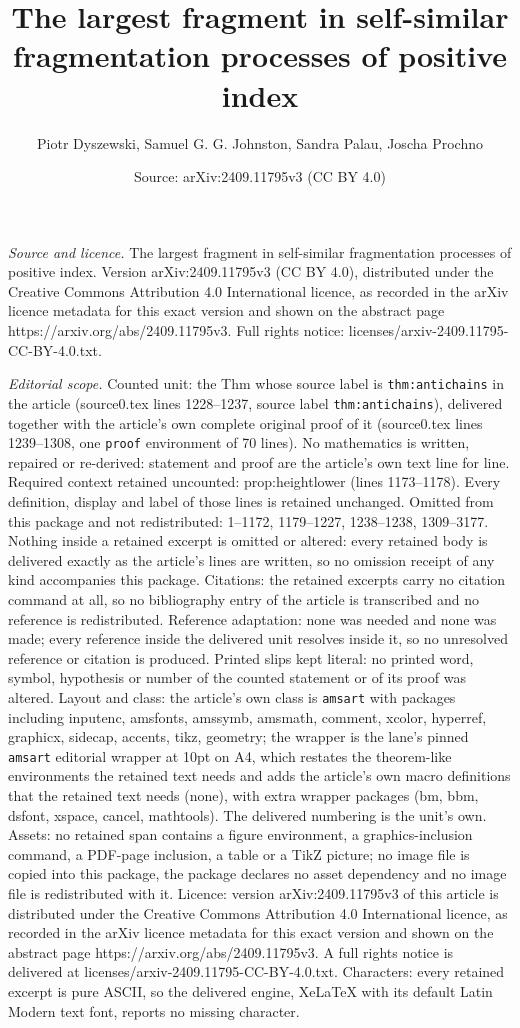 \documentclass[10pt,a4paper]{amsart}
\title[The largest fragment in self-similar fragmentation processes]{The largest fragment in self-similar fragmentation processes of positive index}
\author{Piotr Dyszewski, Samuel G. G. Johnston, Sandra Palau, Joscha Prochno}
\date{Source: arXiv:2409.11795v3 (CC BY 4.0)}
\begin{document}
\maketitle

\noindent\emph{Source and licence.} The largest fragment in self-similar fragmentation processes of positive index. Version arXiv:2409.11795v3 (CC BY 4.0), distributed under the Creative Commons Attribution 4.0 International licence, as recorded in the arXiv licence metadata for this exact version and shown on the abstract page https://arxiv.org/abs/2409.11795v3. Full rights notice: licenses/arxiv-2409.11795-CC-BY-4.0.txt.\par\smallskip

\noindent\textit{Editorial scope.} Counted unit: the Thm whose source label is \texttt{thm:antichains} in the article (source0.tex lines 1228--1237, source label \texttt{thm:antichains}), delivered together with the article's own complete original proof of it (source0.tex lines 1239--1308, one \texttt{proof} environment of 70 lines). No mathematics is written, repaired or re-derived: statement and proof are the article's own text line for line. Required context retained uncounted: prop:heightlower (lines 1173--1178). Every definition, display and label of those lines is retained unchanged. Omitted from this package and not redistributed: 1--1172, 1179--1227, 1238--1238, 1309--3177. Nothing inside a retained excerpt is omitted or altered: every retained body is delivered exactly as the article's lines are written, so no omission receipt of any kind accompanies this package. Citations: the retained excerpts carry no citation command at all, so no bibliography entry of the article is transcribed and no reference is redistributed. Reference adaptation: none was needed and none was made; every reference inside the delivered unit resolves inside it, so no unresolved reference or citation is produced. Printed slips kept literal: no printed word, symbol, hypothesis or number of the counted statement or of its proof was altered. Layout and class: the article's own class is \texttt{amsart} with packages including inputenc, amsfonts, amssymb, amsmath, comment, xcolor, hyperref, graphicx, sidecap, accents, tikz, geometry; the wrapper is the lane's pinned \texttt{amsart} editorial wrapper at 10pt on A4, which restates the theorem-like environments the retained text needs and adds the article's own macro definitions that the retained text needs (none), with extra wrapper packages (bm, bbm, dsfont, xspace, cancel, mathtools). The delivered numbering is the unit's own. Assets: no retained span contains a figure environment, a graphics-inclusion command, a PDF-page inclusion, a table or a TikZ picture; no image file is copied into this package, the package declares no asset dependency and no image file is redistributed with it. Licence: version arXiv:2409.11795v3 of this article is distributed under the Creative Commons Attribution 4.0 International licence, as recorded in the arXiv licence metadata for this exact version and shown on the abstract page https://arxiv.org/abs/2409.11795v3. A full rights notice is delivered at licenses/arxiv-2409.11795-CC-BY-4.0.txt. Characters: every retained excerpt is pure ASCII, so the delivered engine, XeLaTeX with its default Latin Modern text font, reports no missing character.
\end{document}
